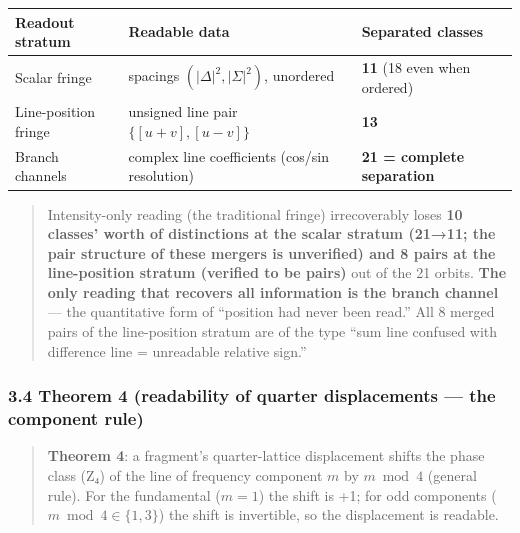 \documentclass[
]{ltjsarticle}
\newcounter{none} %
\begin{document}
{\def\LTcaptype{none} %
\begin{longtable}[]{@{}
  >{\raggedright\arraybackslash}p{}
  >{\raggedright\arraybackslash}p{}
  >{\raggedright\arraybackslash}p{}@{}}
\toprule\noalign{}
\begin{minipage}[b]{\linewidth}\raggedright
Readout stratum
\end{minipage} & \begin{minipage}[b]{\linewidth}\raggedright
Readable data
\end{minipage} & \begin{minipage}[b]{\linewidth}\raggedright
Separated classes
\end{minipage} \\
\midrule\noalign{}
\endhead
\bottomrule\noalign{}
\endlastfoot
Scalar fringe & spacings \((|\Delta|^2,|\Sigma|^2)\), unordered &
\textbf{11} (18 even when ordered) \\
Line-position fringe & unsigned line pair \(\{[u{+}v],[u{-}v]\}\) &
\textbf{13} \\
Branch channels & complex line coefficients (cos/sin resolution) &
\textbf{21 = complete separation} \\
\end{longtable}
}

\begin{quote}
Intensity-only reading (the traditional fringe) irrecoverably loses
\textbf{10 classes' worth of distinctions at the scalar stratum (21→11;
the pair structure of these mergers is unverified) and 8 pairs at the
line-position stratum (verified to be pairs)} out of the 21 orbits.
\textbf{The only reading that recovers all information is the branch
channel} --- the quantitative form of ``position had never been read.''
All 8 merged pairs of the line-position stratum are of the type ``sum
line confused with difference line = unreadable relative sign.''
\end{quote}

\subsubsection{3.4 Theorem 4 (readability of quarter displacements ---
the component
rule)}\label{theorem-4-readability-of-quarter-displacements-the-component-rule}

\begin{quote}
\textbf{Theorem 4}: a fragment's quarter-lattice displacement shifts the
phase class (Z₄) of the line of frequency component \(m\) by
\textbf{\(m\bmod4\)} (general rule). For the fundamental (\(m=1\)) the
shift is +1; for odd components (\(m\bmod4\in\{1,3\}\)) the shift is
invertible, so the displacement is readable.
\end{quote}
\end{document}
